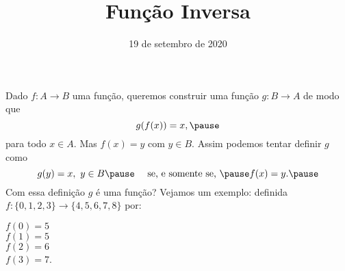 \documentclass{beamer}
\title{Fun\c{c}\~ao Inversa}
\author[\autor]{\autor}
\institute[\instituto]{\instituto}
\date{19 de setembro de 2020}
\begin{document}
    \begin{frame}
        \maketitle
    \end{frame}


    \begin{frame}
        Dado $f : A \to B$ \pause uma fun\c{c}{\~a}o, \pause queremos construir uma fun\c{c}\~ao $g : B \to A$ \pause de modo que
        \[
            g(f(x)) = x,\pause
        \]
        para todo $x \in A$. \pause Mas $f(x) = y$ \pause com $y \in B$. \pause Assim podemos tentar definir $g$ \pause como
        \[
            g(y) = x,\ y \in B \pause \quad \mbox{ se, e somente se, } \pause f(x) = y.\pause
        \]
        Com essa defini\c{c}\~ao \pause $g$ \'e uma fun\c{c}\~ao? \pause Vejamos um exemplo: \pause definida $f : \{0,1,2,3\} \to \{4,5,6,7,8\}$ por:\pause
        \begin{center}
            $f(0) = 5$ \pause\\
            \vspace{.3cm}
            $f(1) = 5$\pause\\
            \vspace{.3cm}
            $f(2) = 6$\pause\\
            \vspace{.3cm}
            $f(3) = 7$.\pause
        \end{center}
    \end{frame}
\end{document}
